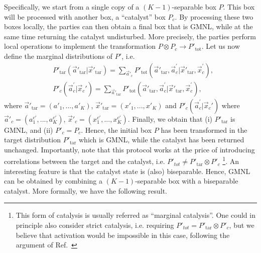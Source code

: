 \documentclass[pra,aps,reprint,superscriptaddress]{revtex4-2}
\theoremstyle{theorem}
\begin{document}
Specifically, we start from a single copy of a $(K-1)$-separable box $P$. This box will be processed with another box, a ``catalyst'' box $P_c$. By processing these two boxes locally, the parties can then obtain a final box that is GMNL, while at the same time returning the catalyst undisturbed. More precisely, the parties perform local operations to implement the transformation $P\otimes P_c\rightarrow P'_{\mathrm{tot}}$. Let us now define the marginal distributions of $P'$, i.e.
\begin{align}
&P'_{\mathrm{tar}}(\vec a'_{\mathrm{tar}}|\vec x'_{\mathrm{tar}}) = \sum_{\vec a'_{c}}P'_{\mathrm{tot}}(\vec a'_{\mathrm{tar}},\vec a^{\prime}_c|\vec x'_{\mathrm{tar}},\vec x^{\prime}_c),\\
&P'_c(\vec a^{\prime}_c|\vec x_c') = \sum_{\vec a'_{\mathrm{tar}}}P'_{\mathrm{tot}}(\vec a'_{\mathrm{tar}},\vec a^{\prime}_c|\vec x'_{\mathrm{tar}},\vec x^{\prime}_c),
\end{align}
where $\vec a'_{\mathrm{tar}} = (a'_1,...,a'_K)$, $\vec x'_{\mathrm{tar}} = (x'_1,...,x'_K)$ and $P'_c(\vec a^{\prime}_c|\vec x_c')$ where $\vec a'_{c} = (a^{c \prime}_1,...,a^{c \prime}_K)$, $\vec x'_{c} = (x^{c \prime}_1,...,x^{c \prime}_K)$. Finally, we obtain that (i) $P'_\mathrm{tar}$ is GMNL, and (ii) $P'_c = P_c$. Hence, the initial box $P$ has been transformed in the target distribution $P'_\mathrm{tar}$ which is GMNL, while the catalyst has been returned unchanged. Importantly, note that this protocol works at the price of introducing correlations between the target and the catalyst, i.e. $P'_{tot} \neq P'_{\mathrm{tar}}\otimes P'_c$ \footnote{This form of catalysis is usually referred as ``marginal catalysis''. One could in principle also consider strict catalysis, i.e. requiring $P'_{tot} = P'_{\mathrm{tar}}\otimes P'_c$, but we believe that activation would be impossible in this case, following the argument of Ref.~\cite{Karvonen_2021}}. An interesting feature is that the catalyst state is (also) biseparable. Hence, GMNL can be obtained by combining a $(K-1)$-separable box with a biseparable catalyst. More formally, we have the following result.
\end{document}
